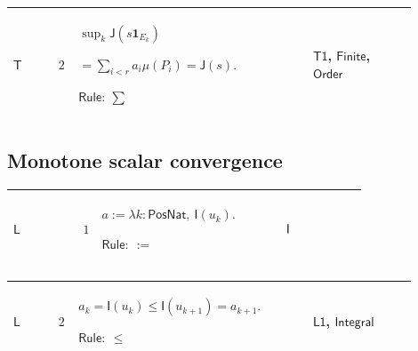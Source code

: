 \documentclass[12pt,reqno]{amsart}
\theoremstyle{blueplain}
\numberwithin{equation}{section}
\newlength{\FATOUOneColumnBody}
\begin{document}
{\scriptsize \setlength{\parskip}{0pt}\nointerlineskip
\noindent 
\begin{tabular}{|@{}>{\centering\arraybackslash}m{0.10658\linewidth}|>{\centering\arraybackslash}m{0.03553\linewidth}|>{\centering\arraybackslash}m{0.52105\linewidth}|>{\centering\arraybackslash}m{0.23684\linewidth}|}
\hline
\hypertarget{proof:T2}{$\displaystyle \mathsf{T}$} & $\displaystyle 2$ & $%
\displaystyle \sup_k\mathsf{J}(s\mathbf{1}_{E_k})$\par$\displaystyle %
{}=\sum_{i<r}a_i\mu(P_i)=\mathsf{J}(s).$\par$\displaystyle \mathsf{Rule}:\
\sum$ & \hyperlink{proof:T1}{$\displaystyle \mathsf{T1}$}, \hyperlink{lem:Finite}%
{$\displaystyle \mathsf{Finite}$}, \hyperlink{ax:Order}{$\displaystyle 
\mathsf{Order}$} \\ \hline
\end{tabular}%
}

\subsection{\protect\scriptsize Monotone scalar convergence}

{\scriptsize \setlength{\parskip}{0pt}\nointerlineskip
\noindent 
\begin{tabular}{|@{}>{\centering\arraybackslash}m{\FATOUOneColumnBody}|}
\hline
$\displaystyle \mathsf{Context\_L}:=$\par$\displaystyle u:\mathsf{PosNat}\to%
\mathsf{F},\quad\mathsf{Mono}(u),$\par$\displaystyle \forall k:\mathsf{PosNat%
},\ \mathsf{Measurable}(u_k).$ \\ \hline
\end{tabular}%
}

{\scriptsize \setlength{\parskip}{0pt}\nointerlineskip
\noindent 
\begin{tabular}{|@{}>{\centering\arraybackslash}m{0.10658\linewidth}|>{\centering\arraybackslash}m{0.03553\linewidth}|>{\centering\arraybackslash}m{0.52105\linewidth}|>{\centering\arraybackslash}m{0.23684\linewidth}|}
\hline
\hypertarget{proof:L1}{$\displaystyle \mathsf{L}$} & $\displaystyle 1$ & $%
\displaystyle a:=\lambda k:\mathsf{PosNat},\ \mathsf{I}(u_k).$\par$%
\displaystyle \mathsf{Rule}:\ :=$ & \hyperlink{def:I}{$\displaystyle \mathsf{%
I}$} \\ \hline
\end{tabular}%
}

{\scriptsize \setlength{\parskip}{0pt}\nointerlineskip
\noindent 
\begin{tabular}{|@{}>{\centering\arraybackslash}m{0.10658\linewidth}|>{\centering\arraybackslash}m{0.03553\linewidth}|>{\centering\arraybackslash}m{0.52105\linewidth}|>{\centering\arraybackslash}m{0.23684\linewidth}|}
\hline
\hypertarget{proof:L2}{$\displaystyle \mathsf{L}$} & $\displaystyle 2$ & $%
\displaystyle a_k=\mathsf{I}(u_k)\le\mathsf{I}(u_{k+1})=a_{k+1}.$\par$%
\displaystyle \mathsf{Rule}:\ \le$ & \hyperlink{proof:L1}{$\displaystyle 
\mathsf{L1}$}, \hyperlink{lem:Integral}{$\displaystyle \mathsf{Integral}$}
\\ \hline
\end{tabular}%
}
\end{document}

